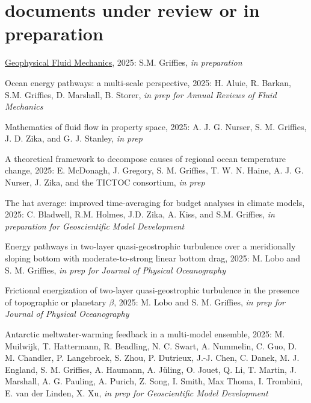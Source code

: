 \section*{\sc \color{Maroon} documents under review or in preparation}

\small 

\begin{etaremune}

\item \href{https://stephengriffies.github.io/assets/pdfs/GFM_lectures.pdf}{Geophysical Fluid Mechanics}, 2025: S.M. Grif\/f\/ies, {\it in preparation}

\item Ocean energy pathways: a multi-scale perspective, 2025: H. Aluie, R. Barkan, S.M. Grif\/f\/ies, D. Marshall, B. Storer, {\it in prep for Annual Reviews of Fluid Mechanics}

\item Mathematics of fluid flow in property space, 2025: A. J. G. Nurser, S. M. Grif\/f\/ies,  J. D. Zika, and G. J. Stanley, {\it in prep}

\item A theoretical framework to decompose causes of regional ocean temperature change, 2025: E. McDonagh, J. Gregory, S. M. Grif\/f\/ies, T. W. N. Haine, A. J. G. Nurser, J. Zika, and the TICTOC consortium, {\it in prep}

\item The hat average: improved time-averaging for budget analyses in climate models, 2025: C. Bladwell,  R.M. Holmes, J.D. Zika, A. Kiss, and S.M. Grif\/f\/ies, {\it in preparation for Geoscientific Model Development}

\item Energy pathways in two-layer quasi-geostrophic turbulence over a meridionally sloping bottom with moderate-to-strong linear bottom drag, 2025: M. Lobo and S. M. Griffies, {\it in prep for Journal of Physical Oceanography}

\item Frictional energization of two-layer quasi-geostrophic turbulence in the presence of topographic or planetary $\beta$, 2025: M. Lobo and S. M. Griffies, {\it in prep for Journal of Physical Oceanography}

\item Antarctic meltwater-warming feedback in a multi-model ensemble, 2025: M. Muilwijk, T. Hattermann, R. Beadling, N. C. Swart, A. Nummelin, C. Guo, D. M. Chandler, P. Langebroek, S. Zhou, P. Dutrieux, J.-J. Chen, C. Danek, M. J. England, S. M. Grif\/f\/ies, A. Haumann, A. {J\"{u}ling}, O. Jouet, Q. Li, T. Martin, J. Marshall, A. G. Pauling, A. Purich, Z. Song, I. Smith, Max Thoma, I. Trombini, E. van der Linden, X. Xu,  {\it in prep for Geoscientific Model Development}


\end{etaremune}
